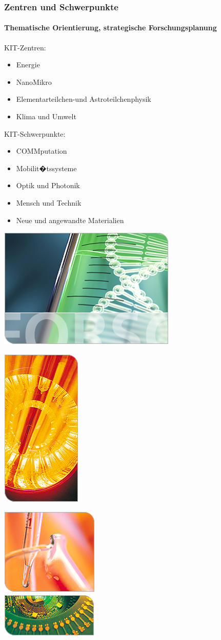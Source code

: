 \documentclass[t]{beamer}
\begin{document}
\begin{frame}
  \frametitle{Zentren und Schwerpunkte}
  \framesubtitle{\mdseries Thematische Orientierung, strategische
    Forschungsplanung}

  \parbox{.65\textwidth}{%
    KIT-Zentren:
    \begin{itemize}
      \item Energie
      \item NanoMikro
      \item Elementarteilchen-und Astroteilchenphysik
      \item Klima und Umwelt
    \end{itemize}
    \bigskip

    KIT-Schwerpunkte:
    \begin{itemize}
      \item COMMputation
      \item Mobilit�tssysteme
      \item Optik und Photonik
      \item Mensch und Technik
      \item Neue und angewandte Materialien
    \end{itemize}}
  \hfill
  \parbox{.3\textwidth}{%
    \includegraphics[width=.3\textwidth]
      {Bilder/KIT-Zentren}\\
    \parbox{.135\textwidth}{%
    \includegraphics[width=.14\textwidth]
      {Bilder/KIT-Schwerpunkt1}}%
    \hfill
    \parbox{.149\textwidth}{%
      \hspace*{-.005\textwidth}%
      \includegraphics[width=.154\textwidth]
        {Bilder/KIT-Schwerpunkt2}\\
      \hspace*{-.005\textwidth}%
      \includegraphics[width=.154\textwidth]
        {Bilder/KIT-Schwerpunkt3}
      \vspace*{.055\textwidth}}}
\end{frame}
\end{document}
